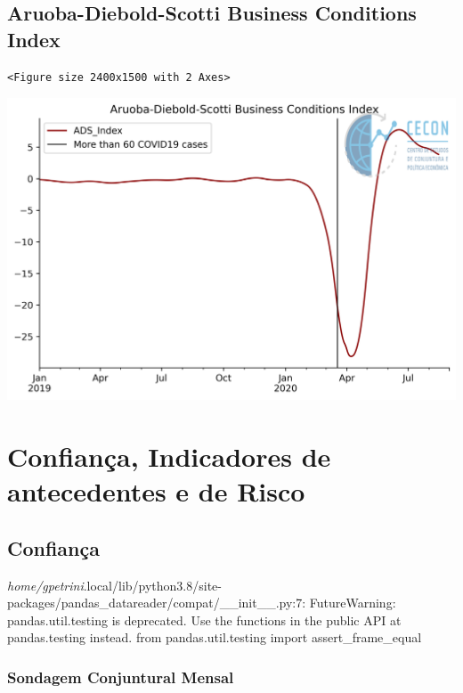 \documentclass[11pt]{article}
\begin{document}
\subsection{Aruoba-Diebold-Scotti Business Conditions Index}
\label{sec:org77ea1f3}

\begin{verbatim}
<Figure size 2400x1500 with 2 Axes>
\end{verbatim}


\begin{center}
\includegraphics[width=.9\linewidth]{obipy-resources/62e383af79e91b63c7fc98dd7fb55b3c3ececcb9/cf14fa691a64e7d5e47f44565dc9f5363854ad6e.png}
\end{center}

\section{Confiança, Indicadores de antecedentes e de Risco}
\label{sec:org77ba10f}

\subsection{Confiança}
\label{sec:org333aecb}

\emph{home/gpetrini}.local/lib/python3.8/site-packages/pandas\_datareader/compat/\_\_init\_\_.py:7: FutureWarning: pandas.util.testing is deprecated. Use the functions in the public API at pandas.testing instead.
  from pandas.util.testing import assert\_frame\_equal

\subsubsection{Sondagem Conjuntural Mensal}
\label{sec:org5e2f7c6}
\end{document}
